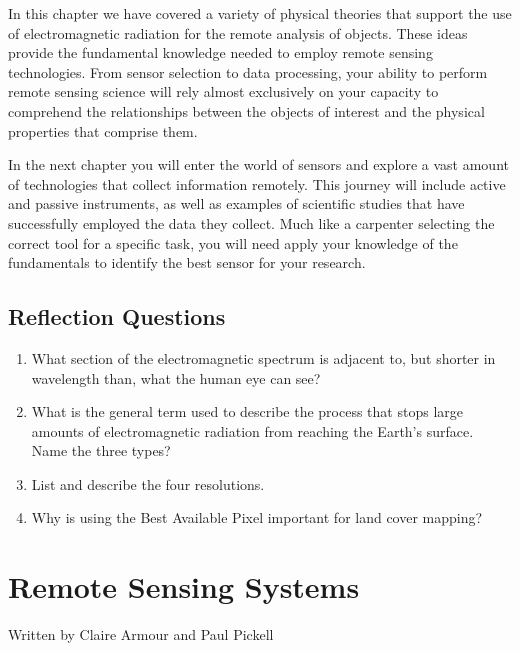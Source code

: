 \documentclass[
]{book}
\providecommand{\tightlist}{%
  \setlength{\itemsep}{0pt}\setlength{\parskip}{0pt}}
\begin{document}
In this chapter we have covered a variety of physical theories that support the use of electromagnetic radiation for the remote analysis of objects. These ideas provide the fundamental knowledge needed to employ remote sensing technologies. From sensor selection to data processing, your ability to perform remote sensing science will rely almost exclusively on your capacity to comprehend the relationships between the objects of interest and the physical properties that comprise them.

In the next chapter you will enter the world of sensors and explore a vast amount of technologies that collect information remotely. This journey will include active and passive instruments, as well as examples of scientific studies that have successfully employed the data they collect. Much like a carpenter selecting the correct tool for a specific task, you will need apply your knowledge of the fundamentals to identify the best sensor for your research.

\section{Reflection Questions}\label{reflection-questions-6}

\begin{enumerate}
\def\labelenumi{\arabic{enumi}.}
\tightlist
\item
  What section of the electromagnetic spectrum is adjacent to, but shorter in wavelength than, what the human eye can see?
\item
  What is the general term used to describe the process that stops large amounts of electromagnetic radiation from reaching the Earth's surface. Name the three types?
\item
  List and describe the four resolutions.
\item
  Why is using the Best Available Pixel important for land cover mapping?
\end{enumerate}

\chapter{Remote Sensing Systems}\label{remote-sensing-systems}

Written by
Claire Armour and Paul Pickell
\end{document}
